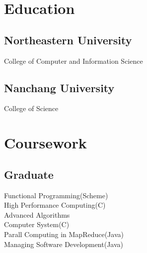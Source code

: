 \documentclass[a4paper]{lyu-resume} %
\begin{document}
\begin{minipage}[t]{0.33\textwidth}

\section{Education} 

\subsection{Northeastern University}

College of Computer and Information Science

\sectionspace %


\subsection{Nanchang University}

College of Science

\sectionspace %


\section{Coursework}

\subsection{Graduate}

Functional Programming(Scheme) \\
High Performance Computing(C)\\
Advanced Algorithms \\
Computer System(C) \\
Parall Computing in MapReduce(Java) \\
Managing Software Development(Java)

\sectionspace %



\end{minipage}
\end{document}
